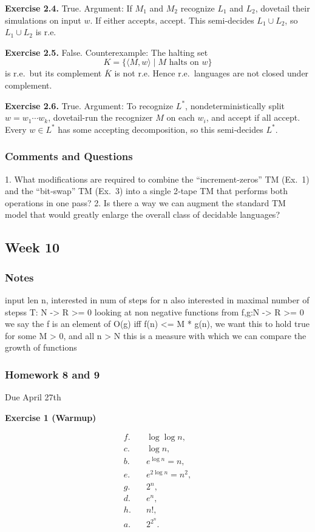 \documentclass{article}
\theoremstyle{theorem}
\theoremstyle{definition}
\theoremstyle{remark}
\begin{document}
\textbf{Exercise 2.4.} True. Argument: If \(M_1\) and \(M_2\) recognize \(L_1\) and \(L_2\), dovetail their simulations on input \(w\). If either accepts, accept. This semi‑decides \(L_1\cup L_2\), so \(L_1\cup L_2\) is r.e.

\textbf{Exercise 2.5.} False. Counterexample: The halting set 
\[
K=\{\langle M,w\rangle\mid M\text{ halts on }w\}
\]
is r.e.\ but its complement \(\overline K\) is not r.e. Hence r.e.\ languages are not closed under complement.

\textbf{Exercise 2.6.} True. Argument: To recognize \(L^*\), nondeterministically split \(w=w_1\cdots w_k\), dovetail-run the recognizer \(M\) on each \(w_i\), and accept if all accept. Every \(w\in L^*\) has some accepting decomposition, so this semi‑decides \(L^*\).


\subsubsection*{Comments and Questions}

1. What modifications are required to combine the “increment‐zeros” TM (Ex. 1) and the “bit‐swap” TM (Ex. 3) into a single 2‑tape TM that performs both operations in one pass?
2. Is there a way we can augment the standard TM model that would greatly enlarge the overall class of decidable languages?

\subsection{Week 10}

\subsubsection*{Notes}

input len n, interested in num of steps for n
also interested in maximal number of stepss
T: N -> R >= 0
looking at non negative functions from f,g:N -> R >= 0
we say the f is an element of O(g) iff f(n) <= M * g(n), we want this to hold true for some M > 0, and all n > N
this is a measure with which we can compare the growth of functions

\subsubsection*{Homework 8 and 9}
Due April 27th

\textbf{Exercise 1 (Warmup)}

\begin{align*}
f.\quad &\log\log n,\\
c.\quad &\log n,\\
b.\quad &e^{\log n} = n,\\
e.\quad &e^{2\log n} = n^2,\\
g.\quad &2^n,\\
d.\quad &e^n,\\
h.\quad &n!,\\
a.\quad &2^{2^n}.
\end{align*}
\end{document}
